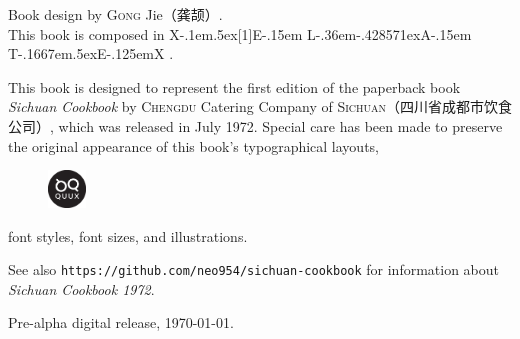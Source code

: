 Book design by \textsc{Gong} Jie\!（龚颉）\!\!.\\
This book is composed in
\begingroup%
\rmfamily%
\footnotesize%
X\kern-.1em\lower.5ex\hbox{\scalebox{-1}[1]{E}}\kern-.15em%
L\kern-.36em\lower-.428571ex\hbox{\tiny{A}}\kern-.15em%
T\kern-.1667em\lower.5ex\hbox{E}\kern-.125emX%
\endgroup%
.

This book is designed to represent the first edition of the paperback book
\textit{Sichuan Cookbook}\!\! by \textsc{Chengdu}
Catering Company of \textsc{Sichuan}\!（四川省成都市饮食公司）\!\!, which was
released in July 1972. Special care has been made to preserve the original
appearance of this book's typographical layouts,
\begin{figure}%
\vspace{-1.25\baselineskip}%
\begin{flushright}%
\quad\includegraphics[height=10mm, width=10mm]{quux-logo.eps}%
\end{flushright}%
\vspace{-1.75\baselineskip}%
\end{figure}%
font styles, font sizes, and illustrations.

See also \texttt{https://github.com/neo954/sichuan-cookbook} for information
about \textit{Sichuan Cookbook 1972}\!\!.

Pre-alpha digital release, \today.

\endgroup%

